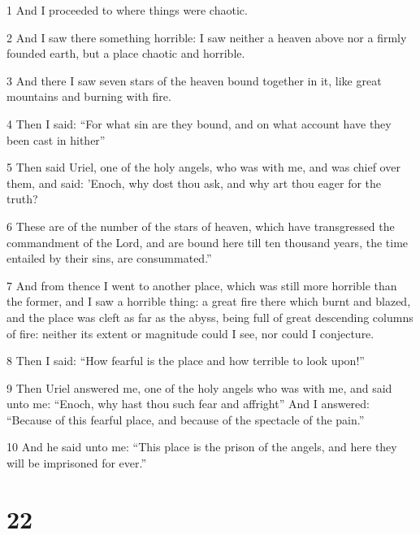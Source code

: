 \par 1 And I proceeded to where things were chaotic.
\par 2 And I saw there something horrible: I saw neither a heaven above nor a firmly founded earth, but a place chaotic and horrible.
\par 3 And there I saw seven stars of the heaven bound together in it, like great mountains and burning with fire.
\par 4 Then I said: “For what sin are they bound, and on what account have they been cast in hither”
\par 5 Then said Uriel, one of the holy angels, who was with me, and was chief over them, and said: 'Enoch, why dost thou ask, and why art thou eager for the truth?
\par 6 These are of the number of the stars of heaven, which have transgressed the commandment of the Lord, and are bound here till ten thousand years, the time entailed by their sins, are consummated.”
\par 7 And from thence I went to another place, which was still more horrible than the former, and I saw a horrible thing: a great fire there which burnt and blazed, and the place was cleft as far as the abyss, being full of great descending columns of fire: neither its extent or magnitude could I see, nor could I conjecture.
\par 8 Then I said: “How fearful is the place and how terrible to look upon!”
\par 9 Then Uriel answered me, one of the holy angels who was with me, and said unto me: “Enoch, why hast thou such fear and affright” And I answered: “Because of this fearful place, and because of the spectacle of the pain.”
\par 10 And he said unto me: “This place is the prison of the angels, and here they will be imprisoned for ever.”

\chapter{22}

